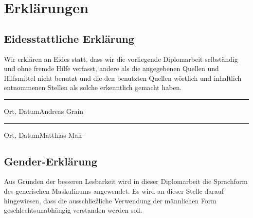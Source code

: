 \documentclass[a4paper, 12pt, twoside, openright
]{memoir}
\newcommand{\blankpage}{
	\newpage
	\null
	\thispagestyle{empty}
	\newpage
}
\begin{document}
\pagestyle{normalpage}
\frontmatter
\begin{titlingpage}
	
\end{titlingpage}

\chapter{Erklärungen}
\section{Eidesstattliche Erklärung}
Wir erklären an Eides statt, dass wir die vorliegende Diplomarbeit selbständig und ohne fremde Hilfe verfasst, andere als die angegebenen Quellen und Hilfsmittel nicht benutzt und die den benutzten Quellen wörtlich und inhaltlich entnommenen Stellen als solche erkenntlich gemacht haben.
\vspace*{1.5cm}
\begin{center}
	\hrule
	\vspace*{0.2cm}
	Ort, Datum\hspace*{0.4\linewidth}Andreas Grain\\
	\vspace*{1.5cm}
	\hrule
	\vspace*{0.2cm}
	Ort, Datum\hspace*{0.4\linewidth}Matthias Mair
\end{center}
\vspace*{1.5cm}

\section{Gender-Erklärung}
Aus Gründen der besseren Lesbarkeit wird in dieser Diplomarbeit die Sprachform des generischen Maskulinums angewendet. Es wird an dieser Stelle darauf hingewiesen, dass die ausschließliche Verwendung der männlichen Form geschlechtsunabhängig verstanden werden soll.
\newpage

\tableofcontents
\blankpage
\end{document}
